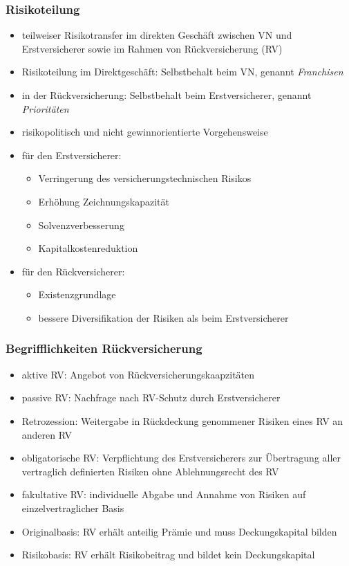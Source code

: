 \documentclass[12pt]{report}
\theoremstyle{dotless}
\theoremstyle{definition}
\begin{document}
\subsubsection{Risikoteilung}

\begin{itemize}
	\item teilweiser Risikotransfer im direkten Geschäft zwischen VN und Erstversicherer sowie im Rahmen von Rückversicherung (RV)
	\item Risikoteilung im Direktgeschäft: Selbstbehalt beim VN, genannt \textit{Franchisen}
	\item in der Rückversicherung: Selbstbehalt beim Erstversicherer, genannt \textit{Prioritäten}
	\item risikopolitisch und nicht gewinnorientierte Vorgehensweise
	\item für den Erstversicherer:
		\begin{itemize}
			\item Verringerung des versicherungstechnischen Risikos
			\item Erhöhung Zeichnungskapazität
			\item Solvenzverbesserung
			\item Kapitalkostenreduktion
		\end{itemize}
	\item für den Rückversicherer:
		\begin{itemize}
			\item Existenzgrundlage
			\item bessere Diversifikation der Risiken als beim Erstversicherer
		\end{itemize}
\end{itemize}

\subsubsection{Begrifflichkeiten Rückversicherung}
\begin{itemize}
	\item aktive RV: Angebot von Rückversicherungskaapzitäten
	\item passive RV: Nachfrage nach RV-Schutz durch Erstversicherer
	\item Retrozession: Weitergabe in Rückdeckung genommener Risiken eines RV an anderen RV
	\item obligatorische RV: Verpflichtung des Erstversicherers zur Übertragung aller vertraglich definierten Risiken ohne Ablehnungsrecht des RV
	\item fakultative RV: individuelle Abgabe und Annahme von Risiken auf einzelvertraglicher Basis
	\item Originalbasis: RV erhält anteilig Prämie und muss Deckungskapital bilden
	\item Risikobasis: RV erhält Risikobeitrag und bildet kein Deckungskapital
\end{itemize}
\end{document}
